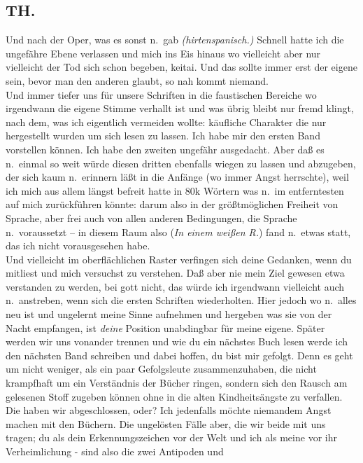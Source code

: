 \documentclass[
]{article}
\author{}
\date{\vspace{-2.5em}}
\begin{document}
\subsection{TH.}\label{th.}

Und nach der Oper, was es sonst n.~gab \emph{(hirtenspanisch.)} Schnell
hatte ich die ungefähre Ebene verlassen und mich ins Eis hinaus wo
vielleicht aber nur vielleicht der Tod sich schon begeben, keitai. Und
das sollte immer erst der eigene sein, bevor man den anderen glaubt, so
nah kommt niemand.\\
Und immer tiefer uns für unsere Schriften in die faustischen Bereiche wo
irgendwann die eigene Stimme verhallt ist und was übrig bleibt nur fremd
klingt, nach dem, was ich eigentlich vermeiden wollte: käufliche
Charakter die nur hergestellt wurden um sich lesen zu lassen. Ich habe
mir den ersten Band vorstellen können. Ich habe den zweiten ungefähr
ausgedacht. Aber daß es n.~einmal so weit würde diesen dritten ebenfalls
wiegen zu lassen und abzugeben, der sich kaum n.~erinnern läßt in die
Anfänge (wo immer Angst herrschte), weil ich mich aus allem längst
befreit hatte in 80k Wörtern was n.~im entferntesten auf mich
zurückführen könnte: darum also in der größtmöglichen Freiheit von
Sprache, aber frei auch von allen anderen Bedingungen, die Sprache
n.~voraussetzt -- in diesem Raum also (\emph{In einem weißen R.}) fand
n.~etwas statt, das ich nicht vorausgesehen habe.\\
Und vielleicht im oberflächlichen Raster verfingen sich deine Gedanken,
wenn du mitliest und mich versuchst zu verstehen. Daß aber nie mein Ziel
gewesen etwa verstanden zu werden, bei gott nicht, das würde ich
irgendwann vielleicht auch n.~anstreben, wenn sich die ersten Schriften
wiederholten. Hier jedoch wo n.~alles neu ist und ungelernt meine Sinne
aufnehmen und hergeben was sie von der Nacht empfangen, ist \emph{deine}
Position unabdingbar für meine eigene. Später werden wir uns vonander
trennen und wie du ein nächstes Buch lesen werde ich den nächsten Band
schreiben und dabei hoffen, du bist mir gefolgt. Denn es geht um nicht
weniger, als ein paar Gefolgsleute zusammenzuhaben, die nicht krampfhaft
um ein Verständnis der Bücher ringen, sondern sich den Rausch am
gelesenen Stoff zugeben können ohne in die alten Kindheitsängste zu
verfallen. Die haben wir abgeschlossen, oder? Ich jedenfalls möchte
niemandem Angst machen mit den Büchern. Die ungelösten Fälle aber, die
wir beide mit uns tragen; du als dein Erkennungszeichen vor der Welt und
ich als meine vor ihr Verheimlichung - sind also die zwei Antipoden und
\end{document}
